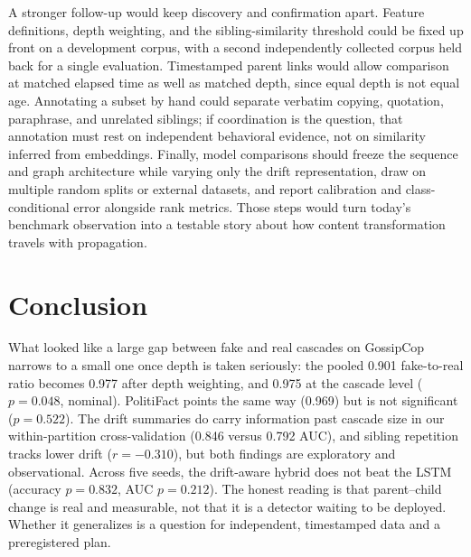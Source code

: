 \documentclass[conference]{IEEEtran}
\begin{document}
A stronger follow-up would keep discovery and confirmation apart. Feature
definitions, depth weighting, and the sibling-similarity threshold could be
fixed up front on a development corpus, with a second independently collected
corpus held back for a single evaluation. Timestamped parent links would allow
comparison at matched elapsed time as well as matched depth, since equal depth
is not equal age. Annotating a subset by hand could separate verbatim copying,
quotation, paraphrase, and unrelated siblings; if coordination is the question,
that annotation must rest on independent behavioral evidence, not on similarity
inferred from embeddings. Finally, model comparisons should freeze the sequence
and graph architecture while varying only the drift representation, draw on
multiple random splits or external datasets, and report calibration and
class-conditional error alongside rank metrics. Those steps would turn today's
benchmark observation into a testable story about how content transformation
travels with propagation.

\section{Conclusion}
What looked like a large gap between fake and real cascades on GossipCop
narrows to a small one once depth is taken seriously: the pooled 0.901
fake-to-real ratio becomes 0.977 after depth weighting, and 0.975 at the
cascade level ($p=0.048$, nominal). PolitiFact points the same way (0.969) but
is not significant ($p=0.522$). The drift summaries do carry information past
cascade size in our within-partition cross-validation (0.846 versus 0.792 AUC),
and sibling repetition tracks lower drift ($r=-0.310$), but both findings are
exploratory and observational. Across five seeds, the drift-aware hybrid does
not beat the LSTM (accuracy $p=0.832$, AUC $p=0.212$). The honest reading is
that parent--child change is real and measurable, not that it is a detector
waiting to be deployed. Whether it generalizes is a question for independent,
timestamped data and a preregistered plan.
\end{document}
